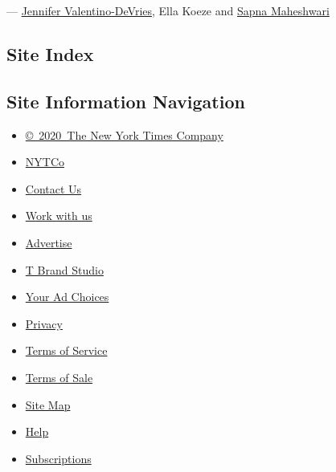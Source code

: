 ---
\href{https://www.nytimes3xbfgragh.onion/by/jennifer-valentino-devries}{Jennifer
Valentino-DeVries}, Ella Koeze and
\href{https://www.nytimes3xbfgragh.onion/by/sapna-maheshwari}{Sapna
Maheshwari}

\hypertarget{site-index}{%
\subsection{Site Index}\label{site-index}}

\hypertarget{site-information-navigation}{%
\subsection{Site Information
Navigation}\label{site-information-navigation}}

\begin{itemize}
\tightlist
\item
  \href{https://help.nytimes3xbfgragh.onion/hc/en-us/articles/115014792127-Copyright-notice}{©~2020~The
  New York Times Company}
\end{itemize}

\begin{itemize}
\tightlist
\item
  \href{https://www.nytco.com/}{NYTCo}
\item
  \href{https://help.nytimes3xbfgragh.onion/hc/en-us/articles/115015385887-Contact-Us}{Contact
  Us}
\item
  \href{https://www.nytco.com/careers/}{Work with us}
\item
  \href{https://nytmediakit.com/}{Advertise}
\item
  \href{http://www.tbrandstudio.com/}{T Brand Studio}
\item
  \href{https://www.nytimes3xbfgragh.onion/privacy/cookie-policy\#how-do-i-manage-trackers}{Your
  Ad Choices}
\item
  \href{https://www.nytimes3xbfgragh.onion/privacy}{Privacy}
\item
  \href{https://help.nytimes3xbfgragh.onion/hc/en-us/articles/115014893428-Terms-of-service}{Terms
  of Service}
\item
  \href{https://help.nytimes3xbfgragh.onion/hc/en-us/articles/115014893968-Terms-of-sale}{Terms
  of Sale}
\item
  \href{https://spiderbites.nytimes3xbfgragh.onion}{Site Map}
\item
  \href{https://help.nytimes3xbfgragh.onion/hc/en-us}{Help}
\item
  \href{https://www.nytimes3xbfgragh.onion/subscription?campaignId=37WXW}{Subscriptions}
\end{itemize}
